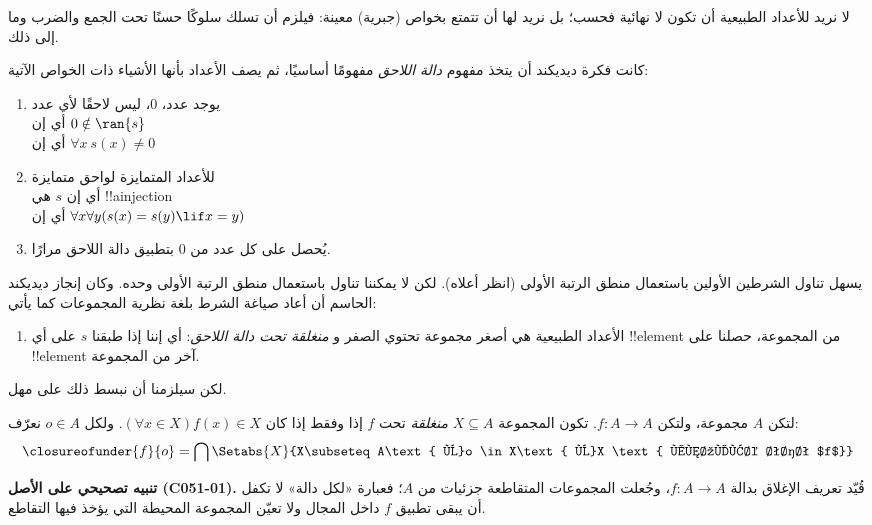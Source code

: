 \documentclass[../../../include/open-logic-section]{subfiles}
\begin{document}

لا نريد للأعداد الطبيعية أن تكون لا نهائية فحسب؛ بل نريد لها أن تتمتع
بخواص (جبرية) معينة: فيلزم أن تسلك سلوكًا حسنًا تحت الجمع والضرب وما
إلى ذلك.

كانت فكرة ديديكند أن يتخذ مفهوم \emph{دالة اللاحق} مفهومًا أساسيًا، ثم
يصف الأعداد بأنها الأشياء ذات الخواص الآتية:
\begin{enumerate}
	\item يوجد عدد، $0$، ليس لاحقًا لأي عدد
	\\أي إن $0 \notin \ran{s}$
	\\أي إن $\forall x\ s(x) \neq 0$
	\item للأعداد المتمايزة لواحق متمايزة
	\\أي إن $s$ هي !!a{injection}
	\\أي إن $\forall x \forall y (s(x) = s(y) \lif x = y)$
	\item{} يُحصل على كل عدد من
	$0$ بتطبيق دالة اللاحق مرارًا.
\end{enumerate}
يسهل تناول الشرطين الأولين باستعمال منطق الرتبة الأولى (انظر أعلاه).
لكن لا يمكننا تناول  باستعمال منطق الرتبة
الأولى وحده. وكان إنجاز ديديكند الحاسم أن أعاد صياغة الشرط
 بلغة نظرية المجموعات كما يأتي:
\begin{enumerate}
	\item[3$'$.] الأعداد الطبيعية هي أصغر مجموعة تحتوي الصفر و
	\emph{منغلقة تحت دالة اللاحق}: أي إننا إذا طبقنا $s$ على أي
	!!{element} من المجموعة، حصلنا على !!{element} آخر من المجموعة.
\end{enumerate}
لكن سيلزمنا أن نبسط ذلك على مهل.

\begin{defn}
	لتكن $A$ مجموعة، ولتكن $f\colon A\to A$. تكون المجموعة
	$X\subseteq A$ \emph{منغلقة} تحت $f$
	{إذا وفقط إذا} كان $(\forall x \in X)f(x) \in X$. ولكل $o\in A$ نعرّف:
	$$\closureofunder{f}{o} = \bigcap\Setabs{X}{X\subseteq A\text{ و}o \in X\text{ و}X
	\text{ منغلقة تحت $f$}}$$
\end{defn}

\textbf{تنبيه تصحيحي على الأصل (C051-01).} قُيّد تعريف الإغلاق بدالة
$f\colon A\to A$، وجُعلت المجموعات المتقاطعة جزئيات من $A$؛ فعبارة
«لكل دالة» لا تكفل أن يبقى تطبيق $f$ داخل المجال ولا تعيّن المجموعة
المحيطة التي يؤخذ فيها التقاطع.
\end{document}
